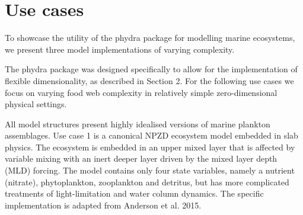 \documentclass[journal abbreviation, manuscript]{copernicus}
\begin{document}
\section{Use cases}

To showcase the utility of the phydra package for modelling marine ecosystems, we present three model implementations of varying complexity.

The phydra package was designed specifically to allow for the implementation of flexible dimensionality, as described in Section 2. For the following use cases we focus on varying food web complexity in relatively simple zero-dimensional physical settings. 

All model structures present highly idealised versions of marine plankton assemblages. Use case 1 is a canonical NPZD ecosystem model embedded in slab physics. The ecosystem is embedded in an upper mixed layer that is affected by variable mixing with an inert deeper layer driven by the mixed layer depth (MLD) forcing. The model contains only four state variables, namely a nutrient  (nitrate), phytoplankton, zooplankton and detritus, but has more complicated treatments of light-limitation and water column dynamics. The specific implementation is adapted from Anderson et al. 2015. 
\end{document}
